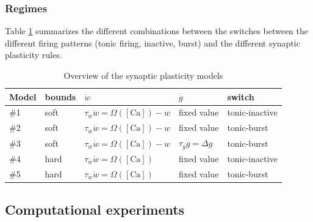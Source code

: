 \subsubsection{Regimes}
Table \ref{tab:SP_overview} summarizes the different combinations between the switches between the different firing patterns (tonic firing, inactive, burst) and the different synaptic plasticity rules. 

\begin{table}[h]
    \centering
    \begin{tabular}{l|l|l|l|l}
        Model     & bounds & $\dot{w}$  & $\dot{g}$ & switch\\
        \hline
         $\#$1   & soft &  $\tau_w \dot{w} = \Omega([\mathrm{Ca}]) -w$ & fixed value   & tonic-inactive\\
         $\#$2   & soft &  $\tau_w \dot{w} = \Omega([\mathrm{Ca}]) -w$ & fixed value   & tonic-burst\\
         $\#$3  & soft &  $\tau_w \dot{w} = \Omega([\mathrm{Ca}]) -w$ & $\tau_g \dot{g} = \Delta g$ & tonic-burst   \\
         $\#$4  & hard &  $\tau_w \dot{w} = \Omega([\mathrm{Ca}])$ & fixed value  & tonic-inactive  \\
         $\#$5 &hard &  $\tau_w \dot{w} = \Omega([\mathrm{Ca}])$ & fixed value  & tonic-burst  \\
    \end{tabular}
    \caption{Overview of the synaptic plasticity models}
    \label{tab:SP_overview}
\end{table}




\subsection*{Computational experiments}
\label{sec:computaional_expm}


